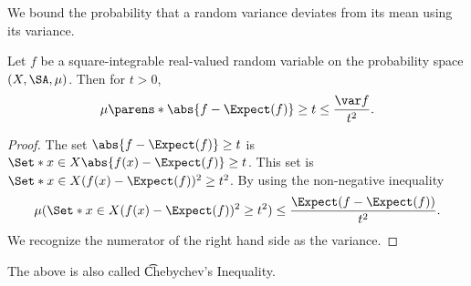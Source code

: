 

We bound the probability
that a random variance
deviates from its mean
using its variance.


\begin{prop}
Let $f$ be a
square-integrable
real-valued
random variable
on the probability
space $(X, \SA, \mu)$.
Then for $t > 0$,
\[
  \mu\parens*{\abs{f - \Expect(f)} \geq t} \leq \frac{\var f}{t^2}.
\]
\begin{proof}
The set
$\abs{f - \Expect(f)} \geq t$
is
$\Set*{x \in X}{ \abs{f(x) - \Expect(f)} \geq t}$.
This set is
$\Set*{x \in X}{({f(x) - \Expect(f)})^2 \geq t^2}$.
By using the non-negative inequality
\[
  \mu(\Set*{x \in X}{({f(x) - \Expect(f)})^2 \geq t^2}) \leq \frac{\Expect(f - \Expect(f))}{t^2}.
\]
We recognize the numerator of the right
hand side as the variance.
\end{proof}
\end{prop}

The above is also called \t{Chebychev's Inequality}.

\blankpage
